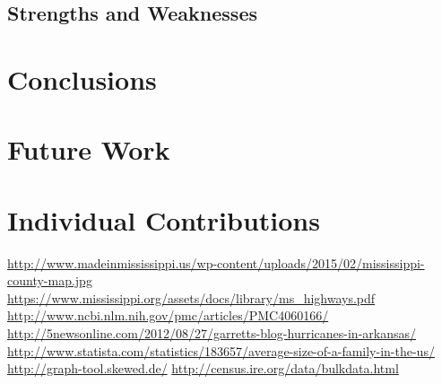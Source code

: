 \documentclass[titlepage]{article}
\begin{document}
  \subsection{Strengths and Weaknesses}

\section{Conclusions}
\label{sec:conclusions}

\section{Future Work}
\label{sec:future}

\section{Individual Contributions}
\label{sec:contributions}
  \begin{thebibliography}{9}
      \url{http://www.madeinmississippi.us/wp-content/uploads/2015/02/mississippi-county-map.jpg}
      \url{https://www.mississippi.org/assets/docs/library/ms_highways.pdf}
      \url{http://www.ncbi.nlm.nih.gov/pmc/articles/PMC4060166/}
      \url{http://5newsonline.com/2012/08/27/garretts-blog-hurricanes-in-arkansas/}
      \url{http://www.statista.com/statistics/183657/average-size-of-a-family-in-the-us/}
      \url{http://graph-tool.skewed.de/}
      \url{http://census.ire.org/data/bulkdata.html}
  \end{thebibliography}
\end{document}
